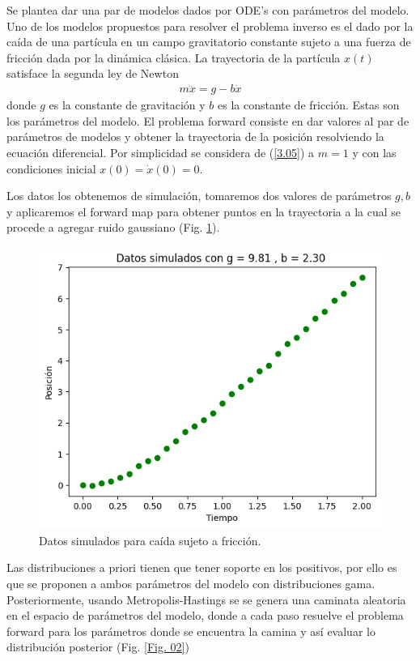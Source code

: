 \documentclass{article}
\begin{document}
Se plantea dar una par de modelos dados por ODE's con parámetros del modelo. Uno de los modelos propuestos para resolver el problema inverso es el dado por la caída de una partícula en un campo gravitatorio constante sujeto a una fuerza de fricción dada por la dinámica clásica. La trayectoria de la partícula $x(t)$ satisface la segunda ley de Newton
\begin{align}
    m\ddot{x} = g - b \dot{x}
    \label{3.05}
\end{align}
donde $g$ es la constante de gravitación y $b$ es la constante de fricción. Estas son los parámetros del modelo. El problema forward consiste en dar valores al par de parámetros de modelos y obtener la trayectoria de la posición resolviendo la ecuación diferencial. Por simplicidad se considera de (\ref{3.05}) a $m =1$ y con las condiciones inicial $x(0)  = \dot{x}(0) = 0$.

Los datos los obtenemos de simulación, tomaremos dos valores de parámetros $g,b$ y aplicaremos el forward map para obtener puntos en la trayectoria a la cual se procede a agregar ruido gaussiano (Fig. \ref{Fig. 01}).

\begin{figure}[H]
    \centering 
    \includegraphics[width = 8 cm]{Figures/datos.png} 
    \caption{Datos simulados para caída sujeto a fricción.}
    \label{Fig. 01}
\end{figure} 

Las distribuciones a priori tienen que tener soporte en los positivos, por ello es que se proponen a ambos parámetros del modelo con distribuciones gama. Posteriormente, usando Metropolis-Hastings se se genera una caminata aleatoria en el espacio de parámetros del modelo, donde a cada paso resuelve el problema forward para los parámetros donde se encuentra la camina y así evaluar lo distribución posterior (Fig. \ref{Fig. 02})
\end{document}
